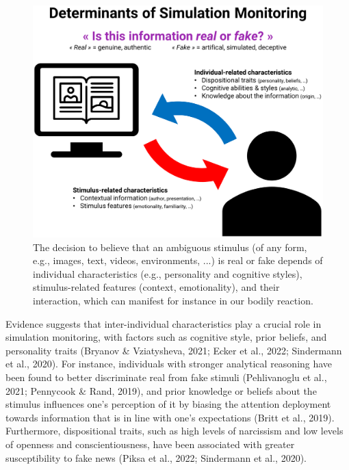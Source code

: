 \documentclass[
  man,floatsintext]{apa6}
\begin{document}
\begin{figure}
\includegraphics[width=1\linewidth]{../figures/Figure1} \caption{The decision to believe that an ambiguous stimulus (of any form, e.g., images, text, videos, environments, ...) is real or fake depends of individual characteristics (e.g., personality and cognitive styles), stimulus-related features (context, emotionality), and their interaction, which can manifest for instance in our bodily reaction.}\label{fig:unnamed-chunk-2}
\end{figure}

Evidence suggests that inter-individual characteristics play a crucial role in simulation monitoring, with factors such as cognitive style, prior beliefs, and personality traits (Bryanov \& Vziatysheva, 2021; Ecker et al., 2022; Sindermann et al., 2020). For instance, individuals with stronger analytical reasoning have been found to better discriminate real from fake stimuli (Pehlivanoglu et al., 2021; Pennycook \& Rand, 2019), and prior knowledge or beliefs about the stimulus influences one's perception of it by biasing the attention deployment towards information that is in line with one's expectations (Britt et al., 2019). Furthermore, dispositional traits, such as high levels of narcissism and low levels of openness and conscientiousness, have been associated with greater susceptibility to fake news (Piksa et al., 2022; Sindermann et al., 2020).
\end{document}
